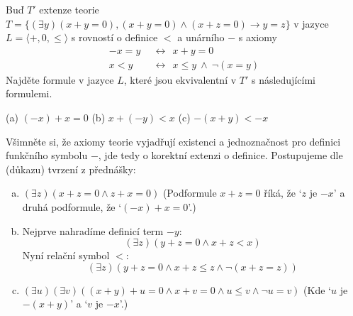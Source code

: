 \begin{problem}

    Buď $T'$ extenze teorie $T=\{(\exists y)(x+y=0),(x+y=0)\wedge (x+z=0)\rightarrow y=z\}$ v jazyce $L=\langle +,0,\le\rangle$ s rovností o definice $<$ a unárního $-$ s axiomy
    \begin{align*}
        -x=y\ \ &\leftrightarrow\ \ x+y=0\\
        x<y\ \ &\leftrightarrow\ \ x\le y\ \wedge\ \neg(x=y)
    \end{align*}
    Najděte formule v jazyce $L$, které jsou ekvivalentní v $T'$ s následujícími formulemi.
        
    (a) $(-x)+x=0$ \hfill (b) $x+(-y)<x$ \hfill (c) $-(x+y)<-x$\hfill{}

    \begin{solution}

        Všimněte si, že axiomy teorie vyjadřují existenci a jednoznačnost pro definici funkčního symbolu $-$, jde tedy o korektní extenzi o definice. Postupujeme dle (důkazu) tvrzení z přednášky:
        \begin{enumerate}[(a)]
            \item $(\exists z)(x+z=0\land z+x=0)$ (Podformule $x+z=0$ říká, že `$z$ je $-x$' a druhá podformule, že `$(-x)+x=0$'.)
            \item Nejprve nahradíme definicí term $-y$: 
            $$
            (\exists z)(y+z=0\land x+z<x)
            $$
            Nyní relační symbol $<$:
            $$
            (\exists z)(y+z=0\land x+z\leq z\land\neg(x+z=z))
            $$
            \item $(\exists u)(\exists v)((x+y)+u=0\land x+v=0\land u\leq v\land \neg u=v)$ (Kde `$u$ je $-(x+y)$' a `$v$ je $-x$'.)
        \end{enumerate}
                    
    \end{solution}
    
\end{problem}


